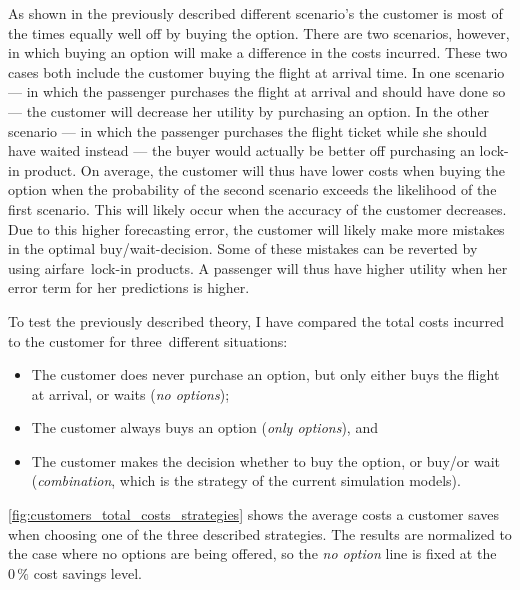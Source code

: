As shown in the previously described different scenario's the customer is most of the times equally well off by buying the option. There are two scenarios, however, in which buying an option will make a difference in the costs incurred. These two cases both include the customer buying the flight at arrival time. In one scenario --- in which the passenger purchases the flight at arrival and should have done so --- the customer will decrease her utility by purchasing an option. In the other scenario --- in which the passenger purchases the flight ticket while she should have waited instead --- the buyer would actually be better off purchasing an lock-in product. On average, the customer will thus have lower costs when buying the option when the probability of the second scenario exceeds the likelihood of the first scenario. This will likely occur when the accuracy of the customer decreases. Due to this higher forecasting error, the customer will likely make more mistakes in the optimal buy/wait-decision. Some of these mistakes can be reverted by using airfare~lock-in products. A passenger will thus have higher utility when her error term for her predictions is higher.

To test the previously described theory, I have compared the total costs incurred to the customer for three~different situations:
\begin{itemize}
    \item The customer does never purchase an option, but only either buys the flight at arrival, or waits (\emph{no options});
    \item The customer always buys an option (\emph{only options}), and
    \item The customer makes the decision whether to buy the option, or buy/or wait (\emph{combination}, which is the strategy of the current simulation models).
\end{itemize}

\autoref{fig:customers_total_costs_strategies} shows the average costs a customer saves when choosing one of the three described strategies. The results are normalized to the case where no options are being offered, so the \emph{no option} line is fixed at the $0\,\%$ cost savings level.


